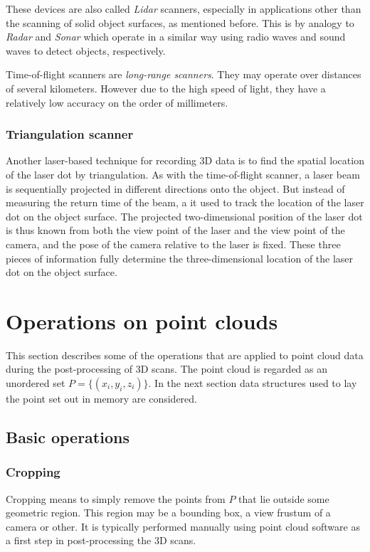 These devices are also called \emph{Lidar} scanners, especially in applications other than the scanning of solid object surfaces, as mentioned before. This is by analogy to \emph{Radar} and \emph{Sonar} which operate in a similar way using radio waves and sound waves to detect objects, respectively.

Time-of-flight scanners are \emph{long-range scanners}. They may operate over distances of several kilometers. However due to the high speed of light, they have a relatively low accuracy on the order of millimeters.

\subsubsection{Triangulation scanner}
Another laser-based technique for recording 3D data is to find the spatial location of the laser dot by triangulation. As with the time-of-flight scanner, a laser beam is sequentially projected in different directions onto the object. But instead of measuring the return time of the beam, a it used to track the location of the laser dot on the object surface. The projected two-dimensional position of the laser dot is thus known from both the view point of the laser and the view point of the camera, and the pose of the camera relative to the laser is fixed. These three pieces of information fully determine the three-dimensional location of the laser dot on the object surface.





\section{Operations on point clouds}
This section describes some of the operations that are applied to point cloud data during the post-processing of 3D scans. The point cloud is regarded as an unordered set $P = \{ (x_i, y_i, z_i) \}$. In the next section data structures used to lay the point set out in memory are considered.


\subsection{Basic operations}

\subsubsection{Cropping}
Cropping means to simply remove the points from $P$ that lie outside some geometric region. This region may be a bounding box, a view frustum of a camera or other. It is typically performed manually using point cloud software as a first step in post-processing the 3D scans.

